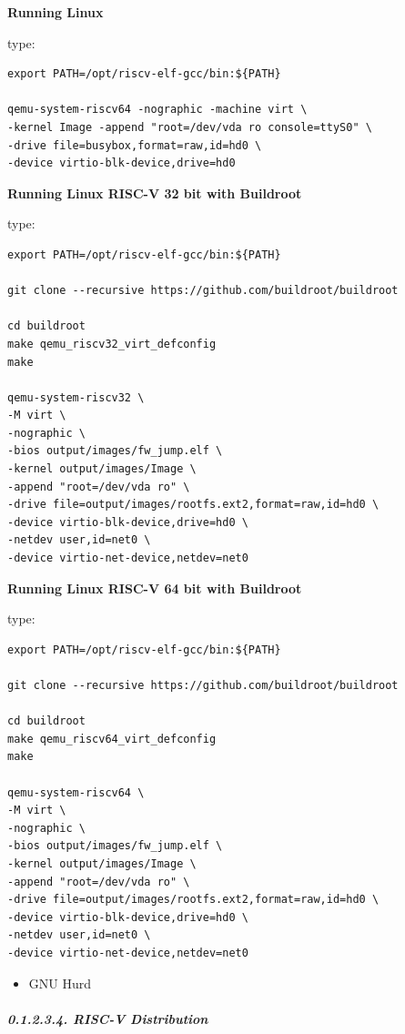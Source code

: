 \documentclass[
]{article}
\providecommand{\tightlist}{%
  \setlength{\itemsep}{0pt}\setlength{\parskip}{0pt}}
\begin{document}
\textbf{Running Linux}

type:

\begin{verbatim}
export PATH=/opt/riscv-elf-gcc/bin:${PATH}

qemu-system-riscv64 -nographic -machine virt \
-kernel Image -append "root=/dev/vda ro console=ttyS0" \
-drive file=busybox,format=raw,id=hd0 \
-device virtio-blk-device,drive=hd0
\end{verbatim}

\textbf{Running Linux RISC-V 32 bit with Buildroot}

type:

\begin{verbatim}
export PATH=/opt/riscv-elf-gcc/bin:${PATH}

git clone --recursive https://github.com/buildroot/buildroot

cd buildroot
make qemu_riscv32_virt_defconfig
make

qemu-system-riscv32 \
-M virt \
-nographic \
-bios output/images/fw_jump.elf \
-kernel output/images/Image \
-append "root=/dev/vda ro" \
-drive file=output/images/rootfs.ext2,format=raw,id=hd0 \
-device virtio-blk-device,drive=hd0 \
-netdev user,id=net0 \
-device virtio-net-device,netdev=net0
\end{verbatim}

\textbf{Running Linux RISC-V 64 bit with Buildroot}

type:

\begin{verbatim}
export PATH=/opt/riscv-elf-gcc/bin:${PATH}

git clone --recursive https://github.com/buildroot/buildroot

cd buildroot
make qemu_riscv64_virt_defconfig
make

qemu-system-riscv64 \
-M virt \
-nographic \
-bios output/images/fw_jump.elf \
-kernel output/images/Image \
-append "root=/dev/vda ro" \
-drive file=output/images/rootfs.ext2,format=raw,id=hd0 \
-device virtio-blk-device,drive=hd0 \
-netdev user,id=net0 \
-device virtio-net-device,netdev=net0
\end{verbatim}

\begin{itemize}
\tightlist
\item
  GNU Hurd
\end{itemize}

\hypertarget{risc-v-distribution-1}{%
\subparagraph{0.1.2.3.4. RISC-V
Distribution}\label{risc-v-distribution-1}}
\end{document}
